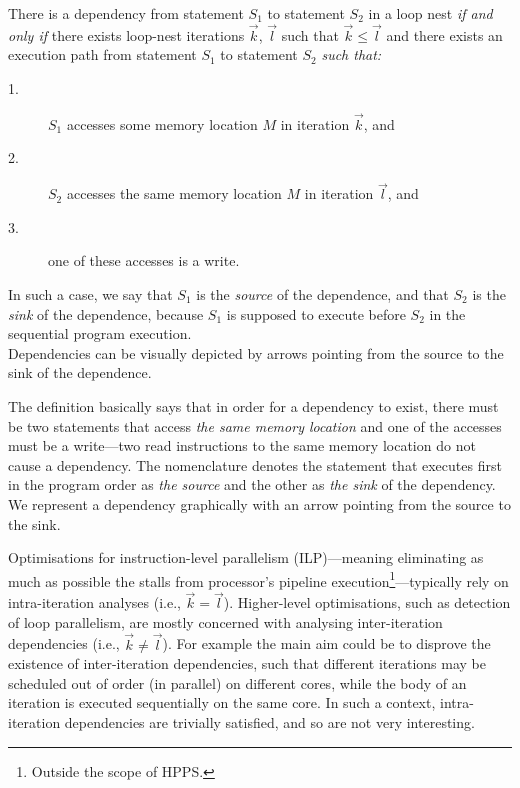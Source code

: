 \begin{definition}\label{Loop-Dep}
  There is a dependency from statement $S_1$ to statement $S_2$
  in a loop nest {\em if and only if} there exists loop-nest
  iterations $\vec{k}$, $\vec{l}$ such that $\vec{k} \leq \vec{l}$
  and there exists an execution path from statement $S_{1}$ to
  statement $S_{2}$ \emph{such that:}
  \begin{description}
  \item[1.] $S_{1}$ accesses some memory location $M$ in iteration $\vec{k}$, and
  \item[2.] $S_{2}$ accesses the same memory location $M$ in iteration $\vec{l}$, and
  \item[3.] one of these accesses is a write.
  \end{description}
  In such a case, we say that $S_1$ is the \emph{source} of the dependence,
  and that $S_{2}$ is the \emph{sink} of the dependence, because $S_1$ is supposed
  to execute before $S_2$ in the sequential program execution.\\
  Dependencies can be visually depicted by arrows pointing from the source
  to the sink of the dependence.
\end{definition}

The definition basically says that in order for a dependency to exist,
there must be two statements that access \emph{the same memory
  location} and one of the accesses must be a write---two read
instructions to the same memory location do not cause a
dependency. The nomenclature denotes the statement that executes first
in the program order as \emph{the source} and the other as \emph{the
  sink} of the dependency. We represent a dependency graphically with
an arrow pointing from the source to the sink.

Optimisations for instruction-level parallelism (ILP)---meaning
eliminating as much as possible the stalls from processor's pipeline
execution\footnote{Outside the scope of HPPS.}---typically rely on
intra-iteration analyses (i.e., $\vec{k}=\vec{l}$).  Higher-level
optimisations, such as detection of loop parallelism, are mostly
concerned with analysing inter-iteration dependencies (i.e.,
$\vec{k}\neq\vec{l}$).  For example the main aim could be to disprove
the existence of inter-iteration dependencies, such that different
iterations may be scheduled out of order (in parallel) on different
cores, while the body of an iteration is executed sequentially on the
same core. In such a context, intra-iteration dependencies are
trivially satisfied, and so are not very interesting.

